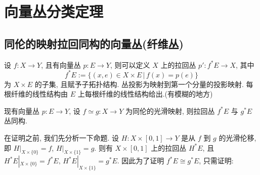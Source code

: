     \section{向量丛分类定理}
    \subsection{同伦的映射拉回同构的向量丛(纤维丛)}
    \begin{definition}[拉回丛的定义]
        设 $f:X\rightarrow Y$, 且有向量丛 $p:E\rightarrow Y$, 则可以定义 $X$ 上的拉回丛 $p':f^*E\rightarrow X$, 其中 
        \begin{equation*}
            f^*E:=\{(x,e)\in X\times E\,\big|\,f(x)=p(e)\}
        \end{equation*}
        为 $X\times E$ 的子集, 且赋予子拓扑结构. 丛投影为映射到第一个分量的投影映射. 每根纤维的线性结构由 $E$ 上每根纤维的线性结构给出.(有模糊的地方)
    \end{definition}
    \begin{proposition}[同伦的映射拉回同构的向量丛]
        现有向量丛 $p:E\rightarrow Y$, 设 $f\simeq g:X\rightarrow Y$ 为同伦的光滑映射, 则拉回丛 $f^*E$ 与 $g^*E$ 丛同构.
    \end{proposition}

    在证明之前, 我们先分析一下命题. 设 $H:X\times[0,1]\rightarrow Y$ 是从 $f$ 到 $g$ 的光滑伦移, 即 $H|_{X\times\{0\}}=f$, $H|_{X\times\{1\}}=g$. 则有 $X\times[0,1]$ 上的拉回丛 $H^*E$, 
    且 $H^*E|_{X\times\{0\}}=f^*E,\,H^*E|_{X\times\{1\}}=g^*E$. 因此为了证明 $f^*E\cong g^*E$, 只需证明:

